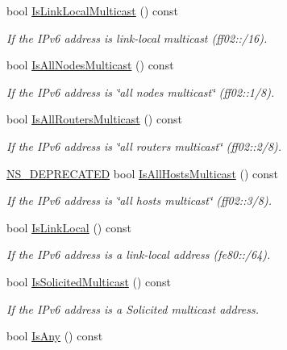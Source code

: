 \begin{DoxyCompactItemize}
bool \hyperlink{classns3_1_1Ipv6Address_aa42014ff8e114b2b4295b3ca289f80bf}{Is\+Link\+Local\+Multicast} () const 
\begin{DoxyCompactList}\small\item\em If the I\+Pv6 address is link-\/local multicast (ff02\+:\+:/16). \end{DoxyCompactList}\item 
bool \hyperlink{classns3_1_1Ipv6Address_a3063fa987fa3e8fe4461feac1cd0d06f}{Is\+All\+Nodes\+Multicast} () const 
\begin{DoxyCompactList}\small\item\em If the I\+Pv6 address is \char`\"{}all nodes multicast\char`\"{} (ff02\+:\+:1/8). \end{DoxyCompactList}\item 
bool \hyperlink{classns3_1_1Ipv6Address_a1f8a224aee6413598d8683753428a86a}{Is\+All\+Routers\+Multicast} () const 
\begin{DoxyCompactList}\small\item\em If the I\+Pv6 address is \char`\"{}all routers multicast\char`\"{} (ff02\+:\+:2/8). \end{DoxyCompactList}\item 
\hyperlink{deprecated_8h_a771fbc06c05c32655c757f56492d98c5}{N\+S\+\_\+\+D\+E\+P\+R\+E\+C\+A\+T\+ED} bool \hyperlink{classns3_1_1Ipv6Address_a7762ba1ce598965edcab89d548589b38}{Is\+All\+Hosts\+Multicast} () const 
\begin{DoxyCompactList}\small\item\em If the I\+Pv6 address is \char`\"{}all hosts multicast\char`\"{} (ff02\+:\+:3/8). \end{DoxyCompactList}\item 
bool \hyperlink{classns3_1_1Ipv6Address_a881c3e796e2afdbd49b2ec630ada1126}{Is\+Link\+Local} () const 
\begin{DoxyCompactList}\small\item\em If the I\+Pv6 address is a link-\/local address (fe80\+:\+:/64). \end{DoxyCompactList}\item 
bool \hyperlink{classns3_1_1Ipv6Address_a292dc177ce77bf774118ad3381ec9a7f}{Is\+Solicited\+Multicast} () const 
\begin{DoxyCompactList}\small\item\em If the I\+Pv6 address is a Solicited multicast address. \end{DoxyCompactList}\item 
bool \hyperlink{classns3_1_1Ipv6Address_a6f15ff7a41a6ae2171cdeda2a53179b8}{Is\+Any} () const 

\end{DoxyCompactItemize}
